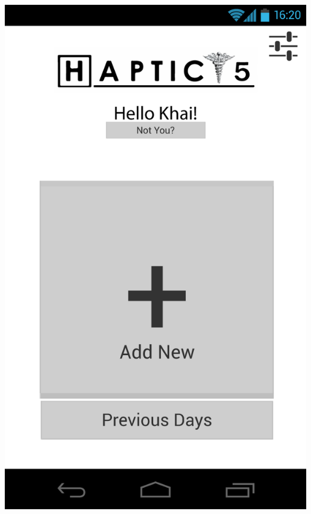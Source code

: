 \documentclass[pdftex,12pt,a4paper]{report}
\begin{document}
\includegraphics[scale=0.18]{Screens/01-Home---No-Selection.png}
\end{document}
